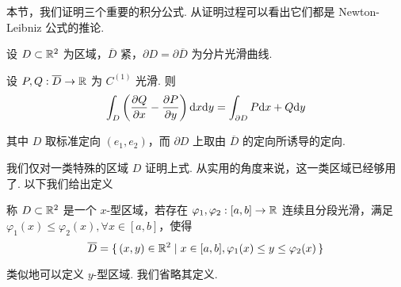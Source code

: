 本节，我们证明三个重要的积分公式. 从证明过程可以看出它们都是 Newton-Leibniz 公式的推论.


\begin{theorem}[Green 公式]
    设 $D\subset\mathbb{R}^2$ 为区域，$\overline{D}$ 紧，$\partial D=\partial\overline{D}$ 为分片光滑曲线.

    设 $P,Q:\overline{D}\to\mathbb{R}$ 为 $C^{(1)}$ 光滑. 则
$$
\int_D\left(\frac{\partial{Q}}{\partial{x}}-\frac{\partial{P}}{\partial{y}}\right)\mathrm{d} x\mathrm{d} y=\int_{\partial D}P\mathrm{d} x+Q\mathrm{d} y
$$

    其中 $D$ 取标准定向 $(e_1,e_2)$，而 $\partial D$ 上取由 $\overline{D}$ 的定向所诱导的定向.
\end{theorem}

我们仅对一类特殊的区域 $D$ 证明上式. 从实用的角度来说，这一类区域已经够用了. 以下我们给出定义

\begin{definition}
    称 $D\subset\mathbb{R}^2$ 是一个 $x$-型区域，若存在 $\varphi_1,\varphi_2:[a,b]\to\mathbb{R}$ 连续且分段光滑，满足 $\varphi_1(x)\le\varphi_2(x),\forall x\in [a,b]$，使得
$$
\overline{D}=\set{(x,y)\in\mathbb{R}^2|x\in[a,b],\varphi_1(x)\le y\le\varphi_2(x)}
$$
\end{definition}


类似地可以定义 $y$-型区域. 我们省略其定义.

